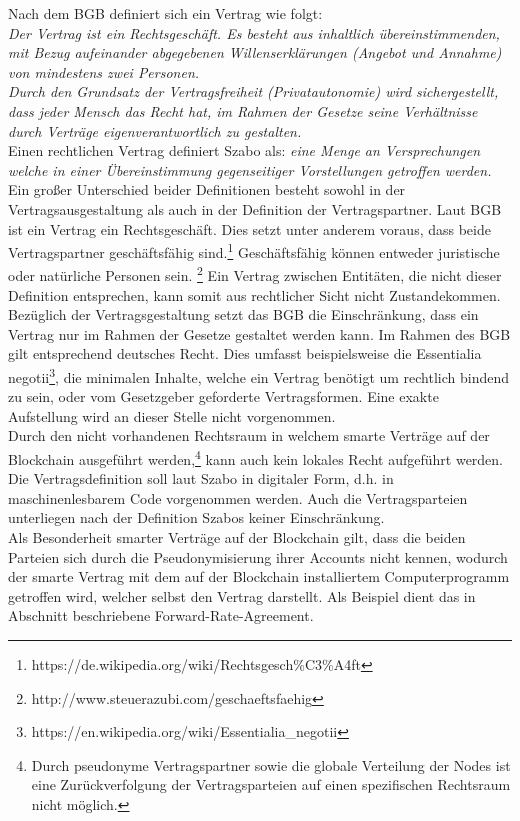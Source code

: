 Nach dem \ac{BGB} definiert sich ein Vertrag wie folgt:\\
\textit{\glqq 
	Der Vertrag ist ein Rechtsgeschäft. Es besteht aus inhaltlich übereinstimmenden, mit Bezug aufeinander abgegebenen Willenserklärungen (Angebot und Annahme) von mindestens zwei Personen.\\
	Durch den Grundsatz der Vertragsfreiheit (Privatautonomie) wird sichergestellt, dass jeder Mensch das Recht hat, im Rahmen der Gesetze seine Verhältnisse durch Verträge eigenverantwortlich zu gestalten.\grqq{}}
\\

Einen rechtlichen Vertrag definiert Szabo als:
\textit{\glqq  eine Menge an Versprechungen welche in einer \glqq Übereinstimmung gegenseitiger Vorstellungen\grqq{} getroffen werden.\grqq{}}\\


Ein großer Unterschied beider Definitionen besteht sowohl in der Vertragsausgestaltung als auch in der Definition der Vertragspartner. Laut BGB ist ein Vertrag ein Rechtsgeschäft. Dies setzt unter anderem voraus, dass beide Vertragspartner geschäftsfähig sind.\footnote{https://de.wikipedia.org/wiki/Rechtsgesch\%C3\%A4ft} 
Geschäftsfähig können entweder juristische oder natürliche Personen sein. \footnote{http://www.steuerazubi.com/geschaeftsfaehig} 
Ein Vertrag zwischen Entitäten, die nicht dieser Definition entsprechen, kann somit aus rechtlicher Sicht nicht Zustandekommen.\\

Bezüglich der Vertragsgestaltung setzt das BGB die Einschränkung, dass ein Vertrag nur im Rahmen der Gesetze gestaltet werden kann. Im Rahmen des BGB gilt entsprechend deutsches Recht. Dies umfasst beispielsweise die Essentialia negotii\footnote{https://en.wikipedia.org/wiki/Essentialia\_negotii}, die minimalen Inhalte, welche ein Vertrag benötigt um rechtlich bindend zu sein, oder vom Gesetzgeber geforderte Vertragsformen. Eine exakte Aufstellung wird an dieser Stelle nicht vorgenommen.\\

Durch den nicht vorhandenen Rechtsraum in welchem smarte Verträge auf der Blockchain ausgeführt werden,\footnote{Durch pseudonyme Vertragspartner sowie die globale Verteilung der Nodes ist eine Zurückverfolgung der Vertragsparteien auf einen spezifischen Rechtsraum nicht möglich.} kann auch kein lokales Recht aufgeführt werden. Die Vertragsdefinition soll laut Szabo in digitaler Form, d.h. in maschinenlesbarem Code vorgenommen werden.
 Auch die Vertragsparteien unterliegen nach der Definition Szabos keiner Einschränkung. \\
 Als Besonderheit smarter Verträge auf der Blockchain gilt, dass die beiden Parteien sich durch die Pseudonymisierung ihrer Accounts nicht kennen, wodurch der smarte Vertrag mit dem auf der Blockchain installiertem Computerprogramm getroffen wird, welcher selbst den Vertrag darstellt. Als Beispiel dient das in Abschnitt  beschriebene Forward-Rate-Agreement.\\

